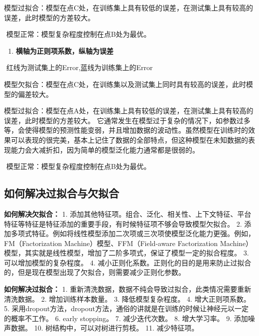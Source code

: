 ​
模型过拟合：模型在点C处，在训练集上具有较低的误差，在测试集上具有较高的误差，此时模型的方差较大。

​ 模型正常：模型复杂程度控制在点B处为最优。

\begin{enumerate}
\def\labelenumi{\arabic{enumi}.}
\setcounter{enumi}{2}
\item
  \textbf{横轴为正则项系数，纵轴为误差}
\end{enumerate}


​ 红线为测试集上的Error,蓝线为训练集上的Error

​
模型欠拟合：模型在点C处，在训练集以及测试集上同时具有较高的误差，此时模型的偏差较大。

​
模型过拟合：模型在点A处，在训练集上具有较低的误差，在测试集上具有较高的误差，此时模型的方差较大。
它通常发生在模型过于复杂的情况下，如参数过多等，会使得模型的预测性能变弱，并且增加数据的波动性。虽然模型在训练时的效果可以表现的很完美，基本上记住了数据的全部特点，但这种模型在未知数据的表现能力会大减折扣，因为简单的模型泛化能力通常都是很弱的。

​ 模型正常：模型复杂程度控制在点B处为最优。

\subsection{如何解决过拟合与欠拟合}\label{ux5982ux4f55ux89e3ux51b3ux8fc7ux62dfux5408ux4e0eux6b20ux62dfux5408}

\textbf{如何解决欠拟合：} 1.
添加其他特征项。组合、泛化、相关性、上下文特征、平台特征等特征是特征添加的重要手段，有时候特征项不够会导致模型欠拟合。
2.
添加多项式特征。例如将线性模型添加二次项或三次项使模型泛化能力更强。例如，FM（Factorization
Machine）模型、FFM（Field-aware Factorization
Machine）模型，其实就是线性模型，增加了二阶多项式，保证了模型一定的拟合程度。
3. 可以增加模型的复杂程度。 4.
减小正则化系数。正则化的目的是用来防止过拟合的，但是现在模型出现了欠拟合，则需要减少正则化参数。

\textbf{如何解决过拟合：} 1.
重新清洗数据，数据不纯会导致过拟合，此类情况需要重新清洗数据。 2.
增加训练样本数量。 3. 降低模型复杂程度。 4. 增大正则项系数。 5.
采用dropout方法，dropout方法，通俗的讲就是在训练的时候让神经元以一定的概率不工作。
6. early stopping。 7. 减少迭代次数。 8. 增大学习率。 9. 添加噪声数据。
10. 树结构中，可以对树进行剪枝。 11. 减少特征项。

